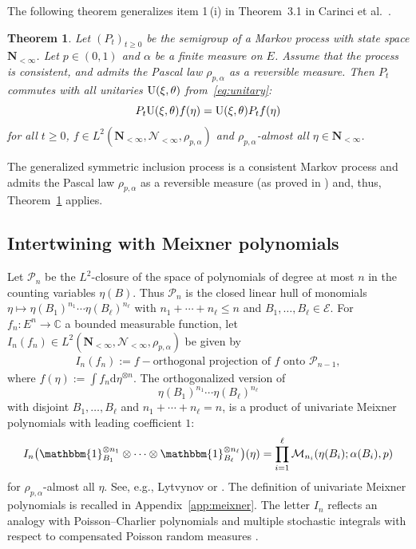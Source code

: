 \documentclass[pdftex]{sigma}
\numberwithin{equation}{section}
\newtheorem{Theorem}{Theorem}[section]
\newcommand{\C}{\mathbb{C}}
\newcommand{\dd}{\mathrm{d}} %
\newcommand{\1}{\mathbbm{1}}
\begin{document}
The following theorem generalizes item 1\,(i) in Theorem~3.1 in Carinci et al.~\cite{carinci2019orthogonal}.

\begin{Theorem} \label{thm:symmetry}
Let $(P_t)_{t\geq 0}$ be the semigroup of a Markov process with state space $\mathbf N_{<\infty}$. Let $p\in (0,1)$ and $\alpha$ be a finite measure on $E$. Assume that the process is consistent, and admits the Pascal law $\rho_{p,\alpha}$ as a reversible measure. Then $P_t$ commutes with all unitaries ${\rm U}(\xi,\theta)$ from~\eqref{eq:unitary}:
	\[
		P_t {\rm U}(\xi,\theta) f(\eta) = {\rm U}(\xi,\theta) P_t f (\eta)
	\]
	for all $t\geq 0$, $f\in L^2(\mathbf N_{<\infty},\mathcal N_{<\infty},\rho_{p,\alpha})$ and $\rho_{p,\alpha}$-almost all $\eta\in \mathbf N_{<\infty}$.
\end{Theorem}

The generalized symmetric inclusion process is a consistent Markov process and admits the Pascal law $\rho_{p,\alpha}$ as a reversible measure (as proved in \cite[Theorem~5.2.]{IntertwiningConsistent}) and, thus, Theorem~\ref{thm:symmetry} applies.

\subsection{Intertwining with Meixner polynomials}
Let $\mathcal P_n$ be the $L^2$-closure of the space of polynomials of degree at most $n$ in the counting variables $\eta(B)$. Thus $\mathcal P_n$ is the closed linear hull of monomials $\eta\mapsto \eta(B_1)^{n_1}\cdots \eta(B_\ell)^{n_\ell}$ with $n_1+\cdots + n_\ell \leq n$ and $B_1,\ldots, B_\ell \in \mathcal E$. For $f_n\colon E^n\to \C$ a bounded measurable function, let $I_n(f_n)\in L^2(\mathbf N_{<\infty},\mathcal N_{<\infty}, \rho_{p,\alpha})$ be given by
\begin{align*}
 I_n(f_n) := f - \text{orthogonal projection of } f \text{ onto } \mathcal P_{n-1},
\end{align*}
where $f(\eta) := \int f_n \dd \eta^{\otimes n}$.
The orthogonalized version of
\[
	\eta(B_1)^{n_1}\cdots \eta(B_\ell)^{n_\ell}
\]
with disjoint $B_1,\ldots, B_\ell$ and $n_1+\cdots+n_\ell =n$, is a product of univariate Meixner polynomials with leading coefficient $1$:
\begin{equation*} %
	I_n\bigl( \1_{B_1}^{\otimes n_1}\otimes \cdots \otimes \1_{B_\ell}^{\otimes n_\ell}\bigr) (\eta) = \prod_{i=1}^\ell \mathcal M_{n_i}(\eta(B_i);\alpha(B_i),p)
\end{equation*}
for $\rho_{p,\alpha}$-almost all $\eta$. See, e.g., Lytvynov \cite[Lemma 3.1]{lytvynov2003JFA} or \cite[Proposition~5.3]{IntertwiningConsistent}.
The definition of univariate Meixner polynomials is recalled in Appendix~\ref{app:meixner}. The letter $I_n$ reflects an analogy with Poisson--Charlier polynomials and multiple stochastic integrals with respect to compensated Poisson random measures \cite[Section 12]{LastPenroseLecturesOnThePoissonProcess}.
\end{document}
